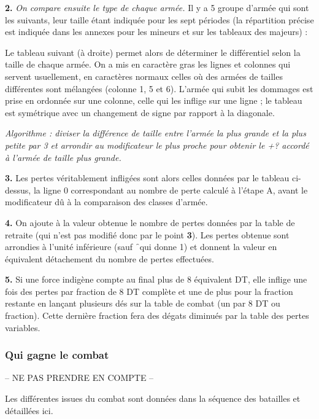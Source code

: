 {\bf 2.}
\textit{On compare ensuite le type de chaque armée.} Il y a 5 groupe d'armée qui sont
les suivants, leur taille étant indiquée pour les sept périodes (la répartition précise est
indiquée dans les annexes pour les mineurs et sur les tableaux des majeurs) :


Le tableau suivant (à droite) permet alors de déterminer le différentiel selon la taille de
chaque armée. On a mis en caractère gras les lignes et colonnes qui servent
usuellement, en caractères normaux celles où des armées
de tailles différentes sont mélangées (colonne 1, 5 et 6).
L'armée qui subit les
dommages est prise en ordonnée sur une colonne, celle qui les inflige sur une
ligne ; le tableau est
symétrique avec un changement de signe par rapport à la diagonale.


\textit{Algorithme : diviser la différence de taille entre l'armée la plus grande et la plus
petite par 3 et arrondir au modificateur le plus proche pour obtenir le +?
accordé à l'armée de taille plus grande.}


{\bf 3.}
Les pertes véritablement infligées sont alors celles données par le tableau
ci-dessus, la ligne 0 correspondant au nombre de perte calculé à l'étape A,
avant le modificateur
dû à la comparaison des classes d'armée.


{\bf 4.}
On ajoute à la valeur obtenue le nombre de pertes données par la table de
retraite (qui n'est pas modifié donc par le point {\bf 3}).
Les pertes obtenue sont arrondies à l'unité inférieure (sauf \f\ qui donne 1)
et donnent la valeur en équivalent détachement du nombre de pertes effectuées.

{\bf 5.}
Si une force indigène compte au final plus de 8 équivalent DT, elle inflige une fois
des pertes par fraction de 8 DT complète et une de plus pour la fraction restante
en lançant plusieurs dés sur la table de combat (un par 8 DT ou fraction).
Cette dernière fraction fera des dégats diminués par la table des pertes variables.



\subsubsection{Qui gagne le combat}
-- NE PAS PRENDRE EN COMPTE --


Les différentes issues du combat sont données dans la séquence des batailles et
détaillées ici.

